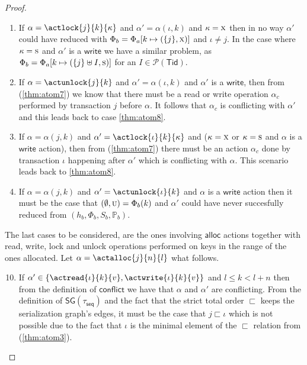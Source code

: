 \begin{thm}
{\begin{proof}
\begin{enumerate}[label=({\roman*})]
	\item If $\alpha = \actlock{j}{k}{\kappa}$ and $\alpha' = \alpha(\iota, k)$ and $\kappa = \textsc{x}$ then in no way $\alpha'$ could have reduced with $\Phi_b = \Phi_a[k \mapsto (\{j\}, \textsc{x})]$ and $\iota \neq j$. In the case where $\kappa = \textsc{s}$ and $\alpha'$ is a $\mathsf{write}$ we have a similar problem, as $\Phi_b = \Phi_a[k \mapsto (\{j\} \uplus I, \textsc{s})]$ for an $I \in \mathcal{P}(\mathsf{Tid})$.
	
	\item If $\alpha = \actunlock{j}{k}$ and $\alpha' = \alpha(\iota, k)$ and $\alpha'$ is a $\mathsf{write}$, then from (\ref{thm:atom7}) we know that there must be a read or write operation $\alpha_c$ performed by transaction $j$ before $\alpha$. It follows that $\alpha_c$ is conflicting with $\alpha'$ and this leads back to case \ref{thm:atom8}.
	
	\item If $\alpha = \alpha(j, k)$ and $\alpha' = \actlock{\iota}{k}{\kappa}$ and ($\kappa = \textsc{x}$ or $\kappa = \textsc{s}$ and $\alpha$ is a $\mathsf{write}$ action), then from (\ref{thm:atom7}) there must be an action $\alpha_c$ done by transaction $\iota$ happening after $\alpha'$ which is conflicting with $\alpha$. This scenario leads back to \ref{thm:atom8}.
	
	\item If $\alpha = \alpha(j, k)$ and $\alpha' = \actunlock{\iota}{k}$ and $\alpha$ is a $\mathsf{write}$ action then it must be the case that $(\emptyset, \textsc{u}) = \Phi_b(k)$ and $\alpha'$ could have never succesfully reduced from $(h_b, \Phi_b, S_b, \mathds{P}_b)$.
\end{enumerate}

The last cases to be considered, are the ones involving $\mathsf{alloc}$ actions together with read, write, lock and unlock operations performed on keys in the range of the ones allocated. Let $\alpha = \actalloc{j}{n}{l}$ what follows.
\begin{enumerate}[label=({\roman*})]
	\setcounter{enumi}{9}
	\item \label{thm:atom9} If $\alpha' \in \{ \actread{\iota}{k}{v}, \actwrite{\iota}{k}{v} \}$ and $l \leq k < l + n$ then from the definition of $\mathsf{conflict}$ we have that $\alpha$ and $\alpha'$ are conflicting. From the definition of $\mathsf{SG(\tau_{seq})}$ and the fact that the strict total order $\sqsubset$ keeps the serialization graph's edges, it must be the case that $j \sqsubset \iota$ which is not possible due to the fact that $\iota$ is the minimal element of the $\sqsubset$ relation from (\ref{thm:atom3}).
	

\end{enumerate}
\end{proof}}
\end{thm}
